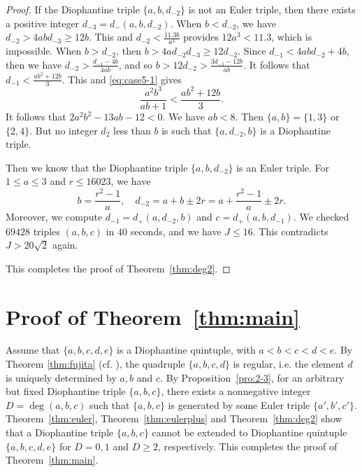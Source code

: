 \documentclass{amsart}
\theoremstyle{definition}
\begin{document}
\begin{proof}
If the Diophantine triple $\{a, b, d_{-2}\}$ is not an Euler triple, then there exists a positive integer $d_{-3}=d_{-}(a,b,d_{-2})$. When $b<d_{-2}$,  we have $d_{-2}>4abd_{-3}\ge 12b$. This and $d_{-2}<\frac{11.3b}{a^3}$ provides $12a^3<11.3$, which is impossible.  When $b>d_{-2}$, then  $b>4ad_{-2}d_{-3}\ge 12d_{-2}$. Since $d_{-1}<4abd_{-2}+4b$, then we have 
$d_{-2}>\frac{d_{-1}-4b}{4ab}$, and so $b>12d_{-2} > \frac{3d_{-1}-12b}{ab}$. It follows that $d_{-1}<\frac{ab^2+12b}{3}$. This and \eqref{eq:case5-1} gives 
$$
\frac{a^2b^3}{ab+1}<\frac{ab^2+12b}{3}. 
$$
It follows that $2a^2b^2-13ab -12<0$. We have $ab<8$. Then $\{a,b\}=\{1,3\}$ or $\{2,4\}$. But no integer $d_{2}$ less than $b$ is such that $\{a,d_{-2},b\}$ is a Diophantine triple. 

Then we know that the Diophantine triple $\{a, b, d_{-2}\}$ is an Euler triple.  For $1\le a\le 3$ and $r\le 16023$, we have 
$$
b=\frac{r^2-1}{a},\quad d_{-2}=a+b\pm2r= a+\frac{r^2-1}{a}\pm 2r.
$$
Moreover, we compute $d_{-1}=d_{+}(a,d_{-2},b)$ and $c=d_{+}(a,b,d_{-1})$.  We checked $69428$ triples $(a,b,c)$ in  
$40$ seconds, and we have $J\le 16$. This contradicts $J>20\sqrt{2}$ again.




This completes the proof of Theorem~\ref{thm:deg2}.
\end{proof}

\section{Proof of Theorem~\ref{thm:main}}\label{sec:9}

Assume that $\{a,b,c,d,e\}$ is a Diophantine quintuple, with $a<b<c<d<e$. By Theorem \ref{thm:fujita} (cf. \cite{Fujita-1}), the quadruple 
$\{a,b,c,d\}$ is regular, i.e. the element $d$ is uniquely determined by $a,b$ and $c$.  By Proposition~\ref{pro:2-3},
for an arbitrary but fixed Diophantine triple $\{a,b,c\}$, there exists a nonnegative integer $D=\deg(a,b,c)$ such that $\{a,b,c\}$
is generated by some Euler triple $\{a',b',c'\}$. Theorem~\ref{thm:euler}, Theorem~\ref{thm:eulerplus} and Theorem~\ref{thm:deg2}
show that a Diophantine triple $\{a,b,c\}$ cannot be extended to Diophantine quintuple $\{a,b,c,d,e\}$ for $D=0,1$ and $D\ge 2$, 
respectively. This completes the proof of Theorem~\ref{thm:main}.  
 
\end{document}
